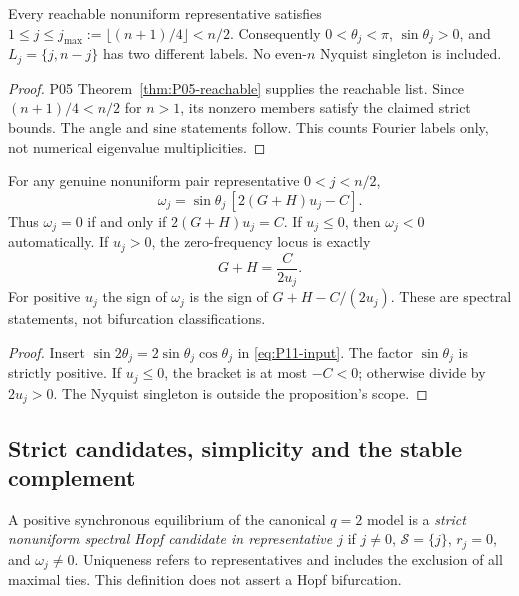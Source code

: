 \begin{lemma}
\label{lem:P11-pairs}
Every reachable nonuniform representative satisfies
$1\le j\le j_{\max}:=\lfloor(n+1)/4\rfloor<n/2$.
Consequently $0<\theta_j<\pi$, $\sin\theta_j>0$, and
$L_j=\{j,n-j\}$ has two different labels. No even-$n$ Nyquist
singleton is included.
\end{lemma}
\begin{proof}
P05 Theorem~\ref{thm:P05-reachable} supplies the reachable list.
Since $(n+1)/4<n/2$ for $n>1$, its nonzero members satisfy the
claimed strict bounds. The angle and sine statements follow.
This counts Fourier labels only, not numerical eigenvalue multiplicities.
\end{proof}

\begin{proposition}
\label{prop:P11-frequency}
For any genuine nonuniform pair representative $0<j<n/2$,
\begin{equation}
 \boxed{\omega_j=\sin\theta_j\,[2(G+H)u_j-C].}
 \label{eq:P11-frequency}
\end{equation}
Thus $\omega_j=0$ if and only if $2(G+H)u_j=C$.
If $u_j\le0$, then $\omega_j<0$ automatically. If $u_j>0$,
the zero-frequency locus is exactly
\begin{equation}
 G+H=\frac{C}{2u_j}.
 \label{eq:P11-zero-frequency}
\end{equation}
For positive $u_j$ the sign of $\omega_j$ is the sign of
$G+H-C/(2u_j)$. These are spectral statements, not bifurcation classifications.
\end{proposition}
\begin{proof}
Insert $\sin2\theta_j=2\sin\theta_j\cos\theta_j$ in
\eqref{eq:P11-input}. The factor $\sin\theta_j$ is strictly positive.
If $u_j\le0$, the bracket is at most $-C<0$; otherwise divide by
$2u_j>0$. The Nyquist singleton is outside the proposition's scope.
\end{proof}

\subsection{Strict candidates, simplicity and the stable complement}
\label{slot:P11-2}
\begin{definition}
\label{def:P11-candidate}
A positive synchronous equilibrium of the canonical $q=2$ model is a
\emph{strict nonuniform spectral Hopf candidate in representative $j$}
if $j\ne0$, $\mathcal S=\{j\}$, $r_j=0$, and $\omega_j\ne0$.
Uniqueness refers to representatives and includes the exclusion of all
maximal ties. This definition does not assert a Hopf bifurcation.
\end{definition}

